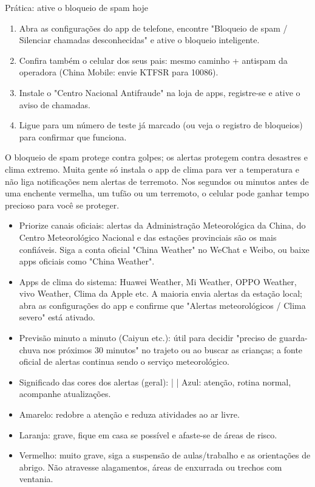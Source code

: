 \begin{tcbpractice}{Prática: ative o bloqueio de spam hoje}
\begin{enumerate}
  \item Abra as configurações do app de telefone, encontre "Bloqueio de spam / Silenciar chamadas desconhecidas" e ative o bloqueio inteligente.
  \item Confira também o celular dos seus pais: mesmo caminho + antispam da operadora (China Mobile: envie KTFSR para 10086).
  \item Instale o "Centro Nacional Antifraude" na loja de apps, registre-se e ative o aviso de chamadas.
  \item Ligue para um número de teste já marcado (ou veja o registro de bloqueios) para confirmar que funciona.
\end{enumerate}

\end{tcbpractice}


O bloqueio de spam protege contra golpes; os alertas protegem contra desastres e clima extremo. Muita gente só instala o app de clima para ver a temperatura e não liga notificações nem alertas de terremoto. Nos segundos ou minutos antes de uma enchente vermelha, um tufão ou um terremoto, o celular pode ganhar tempo precioso para você se proteger.


\begin{itemize}
  \item Priorize canais oficiais: alertas da Administração Meteorológica da China, do Centro Meteorológico Nacional e das estações provinciais são os mais confiáveis. Siga a conta oficial "China Weather" no WeChat e Weibo, ou baixe apps oficiais como "China Weather".
  \item Apps de clima do sistema: Huawei Weather, Mi Weather, OPPO Weather, vivo Weather, Clima da Apple etc. A maioria envia alertas da estação local; abra as configurações do app e confirme que "Alertas meteorológicos / Clima severo" está ativado.
  \item Previsão minuto a minuto (Caiyun etc.): útil para decidir "preciso de guarda-chuva nos próximos 30 minutos" no trajeto ou ao buscar as crianças; a fonte oficial de alertas continua sendo o serviço meteorológico.
  \item Significado das cores dos alertas (geral): | | Azul: atenção, rotina normal, acompanhe atualizações.
  \item Amarelo: redobre a atenção e reduza atividades ao ar livre.
  \item Laranja: grave, fique em casa se possível e afaste-se de áreas de risco.
  \item Vermelho: muito grave, siga a suspensão de aulas/trabalho e as orientações de abrigo. Não atravesse alagamentos, áreas de enxurrada ou trechos com ventania.
\end{itemize}

